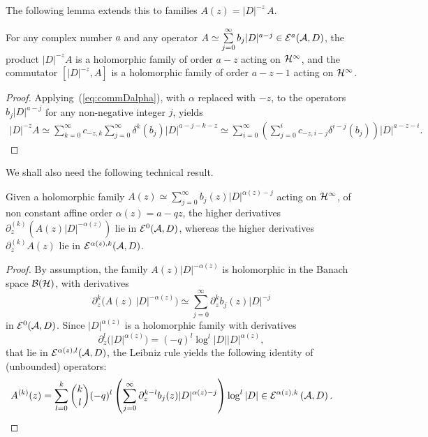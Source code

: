 The following lemma extends this to  families $A(z)=  \vert D\vert^{-z}\, A$.
\begin{lemma} For any complex number $a$ and any operator $ A\simeq \sum\limits_{j=0}^\infty
b_j \vert D\vert^{a-j}\in {\cal E}^a({\cal A}, D)$,  the product
$\vert D\vert^{-z}  A$ is a holomorphic family of order $a-z$ acting on ${\cal H}^\infty$, and the commutator $\left[\vert D\vert^{-z}, A\right]$ is a holomorphic family  of order $a-z-1$ acting on ${\cal H}^\infty$.
\end{lemma}

\begin{proof} Applying~(\ref{eq:commDalpha}), with
$\alpha$ replaced with $-z$,  to the operators $b_j  \vert D\vert^{a-j}$ for any non-negative integer $j$,  yields
\begin{gather*}
 \vert D\vert^{-z}  A \simeq  \sum_{k=0}^\infty c_{-z,k}
  \sum_{j=0}^\infty \delta^k(b_j)   \vert D\vert^{a-j-k-z}
 \simeq  \sum_{i=0}^\infty
 \left( \sum_{j=0}^i  c_{-z,i-j} \delta^{i-j}(b_j)\right)   \vert D\vert^{a-z-i}.\tag*{\qed}
\end{gather*}\renewcommand{\qed}{}
\end{proof}

We shall also need the following technical result.

\begin{proposition}\label{prop:Aprime}  Given a  holomorphic family $A(z)\simeq\sum\limits_{j=0}^\infty
b_j(z) \vert D\vert^{\alpha(z)-j}$  acting on ${\cal H}^\infty$, of non
  constant affine  order
  $\alpha(z)=a-q  z$, the higher   derivatives
 $\partial_z^{(k)}\left(  A(z) \vert D\vert^{-\alpha(z)}\right)$  lie
 in ${\cal E}^{0}({\cal A}, D)$, whereas   the higher   derivatives
 $\partial_z^{(k)} A(z)$  lie
 in ${\cal E}^{\alpha(z), k}({\cal A}, D)$.
\end{proposition}

\begin{proof} By assumption, the family  $A(z)  \vert D\vert^{-\alpha(z)}$ is
holomorphic in the Banach space ${\cal B}({\cal H})$, with derivatives
\[
\partial_z^k\big(A(z)\, \vert D\vert^{-\alpha(z)}\big)\simeq
\sum_{j=0}^\infty \partial_z^k b_j(z)   \vert D\vert^{-j}
\]
in ${\cal E}^0({\cal A}, D)$. Since  $\vert D\vert^{\alpha(z)}$ is a holomorphic
   family with derivatives
   \[
   \partial_z^l\big(\vert D\vert^{\alpha(z)}\big)=
   (-q)^l \log^l \vert D\vert  \vert D\vert^{\alpha(z)},
   \] that lie
in ${\cal E}^{\alpha(z), l}({\cal A }, D)$, the Leibniz rule yields the
following identity of (unbounded) operators:
\begin{gather*}
A^{(k)}(z)= \sum_{l=0}^k {k\choose l} (-q)^l
\left(\sum_{j=0}^\infty \partial_z^{k-l}b_j(z)   \vert D\vert^{\alpha(z)-j}\right)
\log^l \vert D\vert\in {\cal E}^{\alpha(z),k}\left({\cal A}, D\right).\tag*{\qed}
\end{gather*}
\renewcommand{\qed}{}
 \end{proof}

